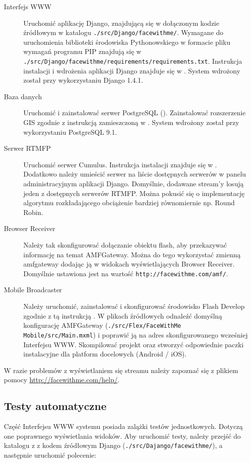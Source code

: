 \begin{description}
    \item[Interfejs WWW] Uruchomić aplikację Django, znajdującą się w dołączonym kodzie źródłowym w katalogu \texttt{./src/Django/facewithme/}. Wymagane do uruchomienia biblioteki środowiska Pythonowskiego w formacie pliku wymagań programu PIP znajdują się w \texttt{./src/Django/facewithme/requirements/requirements.txt}. Instrukcja instalacji i wdrożenia aplikacji Django znajduje się w \cite{DjangoDocs}. System wdrożony został przy wykorzystaniu Django 1.4.1.
    \item[Baza danych] Uruchomić i zainstalować serwer PostgreSQL (\cite{PostgreSQL}). Zainstalować rozszerzenie GIS zgodnie z instrukcją zamieszczoną w \cite{DjangoPostGIS}. System wdrożony został przy wykorzystaniu PostgreSQL 9.1.
    \item[Serwer RTMFP] Uruchomić serwer Cumulus. Instrukcja instalacji znajduje się w \cite{CumulusInstall}. Dodatkowo należy umieścić serwer na liście dostępnych serwerów w panelu administracyjnym aplikacji Django. Domyślnie, dodawane stream'y losują jeden z dostępnych serwerów RTMFP. Można pokusić się o implementację algorytmu rozkładającego obciążenie bardziej równomiernie np. Round Robin.
    \item[Browser Receiver] Należy tak skonfigurować dołączanie obiektu flash, aby przekazywać informację na temat AMFGateway. Można do tego wykorzystać zmienną amfgateway dodając ją w widokach wyświetlających Browser Receiver. Domyślnie ustawiona jest na wartość \texttt{http://facewithme.com/amf/}.
    \item[Mobile Broadcaster] Należy uruchomić, zainstalować i skonfigurować środowisko Flash Develop zgodnie z tą instrukcją \cite{flashDevelopConfig}. W plikach źródłowych odnaleźć domyślną konfigurację AMFGateway (\texttt{./src/Flex/FaceWithMe Mobile/src/Main.mxml}) i poprawić ją na adres skonfigurowanego wcześniej Interfejsu WWW. Skompilować projekt oraz stworzyć odpowiednie paczki instalacyjne dla platform docelowych (Android / iOS).
\end{description}

W razie problemów z wyświetlaniem się streamu należy zapoznać się z plikiem pomocy \url{http://facewithme.com/help/}.

\subsection{Testy automatyczne}

Część Interfejsu WWW systemu posiada zalążki testów jednostkowych. Dotyczą one poprawnego wyświetlania widoków. Aby uruchomić testy, należy przejść do katalogu z z kodem źródłowym Django (\texttt{./src/Dajango/facewithme/}), a następnie uruchomić polecenie:

